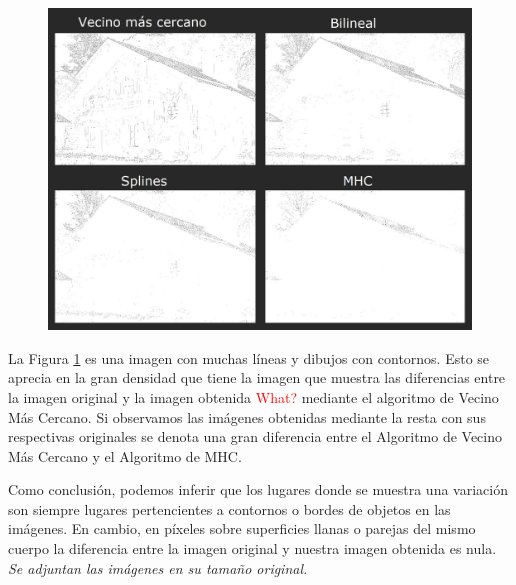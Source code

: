 \documentclass[a4paper]{article}
\begin{document}
\newpage


\begin{figure}[h!]
	\caption{}
	\begin{center}
	\includegraphics[scale=0.40]{imagenes/comparacion/12/collage}
	\label{imagen12}
  \end{center}
\end{figure}

La Figura \ref{imagen12} es una imagen con muchas l\'ineas y dibujos con contornos. Esto se aprecia en la gran densidad que tiene la imagen que muestra las diferencias entre la imagen original y la imagen obtenida \textcolor{red}{What?} mediante el algoritmo de Vecino M\'as Cercano. Si observamos las im\'agenes obtenidas mediante la resta con sus respectivas originales se denota una gran diferencia entre el Algoritmo de Vecino M\'as Cercano y el Algoritmo de MHC.\\

\newpage


Como conclusi\'on, podemos inferir que los lugares donde se muestra una variaci\'on son siempre lugares pertencientes a contornos o bordes de objetos en las im\'agenes. En cambio, en p\'ixeles sobre superficies llanas o parejas del mismo cuerpo la diferencia entre la imagen original y nuestra imagen obtenida es nula.\\

\textit{Se adjuntan las im\'agenes en su tama\~no original.}
\end{document}
